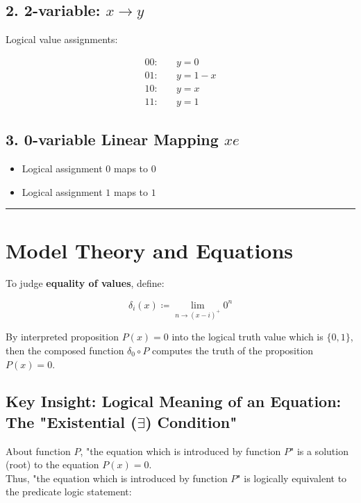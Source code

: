 \documentclass{article}
\begin{document}
\bigskip

\subsection*{2. 2-variable: $x \to y$}

Logical value assignments:

\begin{align*}
00:& \quad y = 0 \\
01:& \quad y = 1 - x \\
10:& \quad y = x \\
11:& \quad y = 1
\end{align*}

\bigskip

\subsection*{3. 0-variable Linear Mapping $xe$}

\begin{itemize}
    \item Logical assignment $0$ maps to $0$
    \item Logical assignment $1$ maps to $1$
\end{itemize}

\bigskip
\hrule
\bigskip

\section*{Model Theory and Equations}

To judge \textbf{equality of values}, define:

\[
\delta_i(x) \coloneqq \lim_{n \to (x - i)^+} 0^n
\]

By interpreted proposition $P(x) = 0$ into the logical truth value which is $\{0, 1\}$,\\
then the composed function $\delta_0 \circ P$ computes the truth of the proposition $P(x) = 0$.

\subsection*{Key Insight: Logical Meaning of an Equation: The "Existential ($\exists$) Condition"}

About function $P$, "the equation which is introduced by function $P$" is a solution (root) to the equation $P(x) = 0$.\\

Thus, "the equation which is introduced by function $P$" is logically equivalent to the predicate logic statement:
\end{document}

